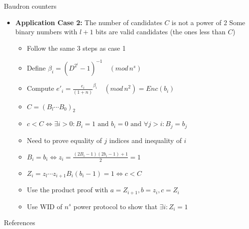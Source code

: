\documentclass{beamer}
\newcommand{\md}[1]{\quad (mod \, {#1})}
\begin{document}
\begin{frame}[allowframebreaks]{Baudron counters}
\begin{itemize}
\framebreak

\item \textbf{Application Case 2:} The number of candidates $C$ is not a power of 2
Some binary numbers with $l+1$ bits are valid candidates (the ones less than $C$)
\begin{itemize}
\item Follow the same 3 steps as case 1
\item Define $\beta_i = (D^{2^i} - 1)^{-1}  \md{n^s}$
\item Compute ${e'}_i = \frac{e_i}{(1+n)}^{\beta_i} \md{n^2} = Enc(b_i)$
\item $C=(B_l \cdots B_0)_2$
\item $c < C \Leftrightarrow \exists i>0: B_i = 1 \text{ and } b_i = 0  \text{ and } \forall j>i: B_j = b_j $ 
\item Need to prove equality of $j$ indices and inequality of $i$ 
\item $B_i = b_i \Leftrightarrow z_i = \frac{(2B_i-1)(2b_i-1)+1}{2} = 1$
\item $Z_i = z_l \cdots z_{i+1}B_i(b_i-1) = 1 \Leftrightarrow c < C$
\item Use the product proof with $a=Z_{i+1}, b=z_i, c=Z_i$ 
\item Use WID of $n^s$ power protocol to show that $\exists i: Z_i=1$
\end{itemize}
\end{itemize}
\end{frame}


\begin{frame}[allowframebreaks]{References}
\begin{small}


\nocite{*}
\end{small}

\end{frame}
\end{document}
